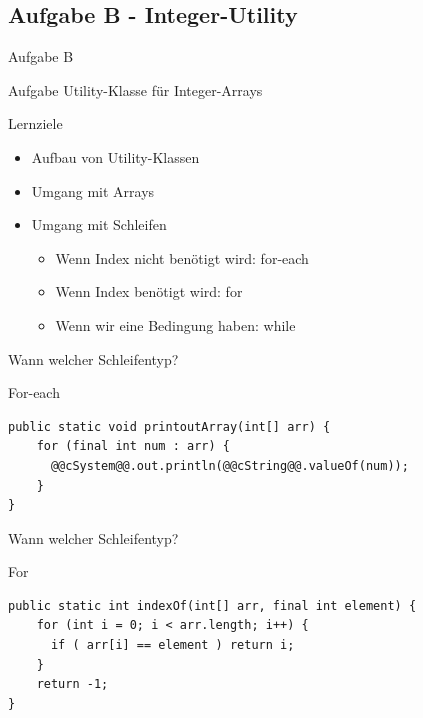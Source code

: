 \documentclass[aspectratio=169]{beamer}
\begin{document}
\subsection{Aufgabe B - Integer-Utility}

\begin{frame}{Aufgabe B}
  \begin{block}{Aufgabe}
    \pause
    Utility-Klasse für Integer-Arrays
  \end{block}

  \pause
  \begin{block}{Lernziele}
    \begin{itemize}
      \item Aufbau von Utility-Klassen
      \pause
      \item Umgang mit Arrays
      \pause
      \item Umgang mit Schleifen \begin{itemize}
        \pause
        \item Wenn Index \color{alertcolor}nicht \color{FGround}benötigt wird: \color{keywordcolor}for-each\color{FGround}
        \pause
        \item Wenn Index benötigt wird: \color{keywordcolor}for\color{FGround}
        \pause
        \item Wenn wir eine Bedingung haben: \color{keywordcolor}while\color{FGround}
      \end{itemize}
    \end{itemize}
  \end{block}
\end{frame}

\begin{frame}[fragile]{Wann welcher Schleifentyp?}
  \begin{exampleblock}{For-each}
    \begin{lstlisting}
public static void printoutArray(int[] arr) {
    for (final int num : arr) {
      @@cSystem@@.out.println(@@cString@@.valueOf(num));
    }
}
    \end{lstlisting}
  \end{exampleblock}
\end{frame}

\begin{frame}[fragile]{Wann welcher Schleifentyp?}
  \begin{exampleblock}{For}
    \begin{lstlisting}
public static int indexOf(int[] arr, final int element) {
    for (int i = 0; i < arr.length; i++) {
      if ( arr[i] == element ) return i;
    }
    return -1;
}
    \end{lstlisting}
  \end{exampleblock}
\end{frame}
\end{document}
